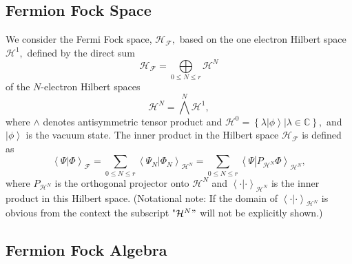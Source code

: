 \documentclass[aps,preprint,amsfonts,amssymb,showpacs,showkeys]{revtex4}%
\begin{document}
\subsection{Fermion Fock Space \label{Fermi Fock Space}}

We consider the Fermi Fock space, $\mathcal{H}_{\mathcal{F}},$ based on the
one electron Hilbert space $\mathcal{H}^{1},$ defined by the direct sum
\begin{equation}
\mathcal{H}_{\mathcal{F}}=\underset{0\leq N\leq r}{\bigoplus}\mathcal{H}^{N}%
\end{equation}
of the $N$-electron Hilbert spaces
\begin{equation}
\mathcal{H}^{N}=\bigwedge\limits^{N}\mathcal{H}^{1},
\end{equation}
where $\wedge$ denotes antisymmetric tensor product and $\mathcal{H}%
^{0}=\left\{  \left.  \lambda\left\vert \phi\right\rangle \right\vert
\lambda\in\mathbb{C}\right\}  ,$ and $\left\vert \phi\right\rangle $ is the
vacuum state. The inner product in the Hilbert space $\mathcal{H}%
_{\mathcal{F}}$ is defined as
\begin{equation}
\left\langle \Psi\left\vert \Phi\right.  \right\rangle _{\mathcal{F}}%
=\sum_{0\leq N\leq r}\left\langle \Psi_{N}\left\vert \Phi_{N}\right.
\right\rangle _{\mathcal{H}^{N}}=\sum_{0\leq N\leq r}\left\langle
\Psi\left\vert P_{\mathcal{H}^{N}}\Phi\right.  \right\rangle _{\mathcal{H}%
^{N}},
\end{equation}
where $P_{\mathcal{H}^{N}}$ is the orthogonal projector onto $\mathcal{H}^{N}$
and $\left\langle \cdot\left\vert \cdot\right.  \right\rangle _{\mathcal{H}%
^{N}}$ is the inner product in this Hilbert space. (Notational note: If the
domain of $\left\langle \cdot\left\vert \cdot\right.  \right\rangle
_{\mathcal{H}^{N}}$ is obvious from the context the subscript "$\mathcal{H}%
^{N}"$ will not be explicitly shown.)

\subsection{Fermion Fock Algebra \label{Fermi Fock Alg}}
\end{document}
